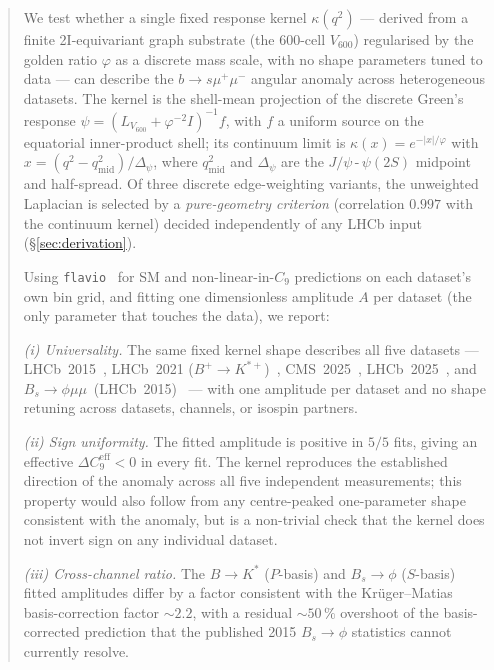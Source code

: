 \documentclass[11pt]{article}
\begin{document}
\begin{abstract}
We test whether a single fixed response kernel $\kappa(q^{2})$ —
derived from a finite 2I-equivariant graph substrate (the 600-cell
$V_{600}$) regularised by the golden ratio $\varphi$ as a discrete
mass scale, with no shape parameters tuned to data — can describe the
$b\to s\mu^{+}\mu^{-}$ angular anomaly across heterogeneous datasets.
The kernel is the shell-mean projection of the discrete Green's
response $\psi = (L_{V_{600}} + \varphi^{-2} I)^{-1} f$, with $f$ a
uniform source on the equatorial inner-product shell; its continuum
limit is $\kappa(x) = e^{-|x|/\varphi}$ with
$x = (q^{2}-q^{2}_{\mathrm{mid}})/\Delta_{\psi}$, where
$q^{2}_{\mathrm{mid}}$ and $\Delta_{\psi}$ are the
$J/\psi$\,-\,$\psi(2S)$ midpoint and half-spread. Of three discrete
edge-weighting variants, the unweighted Laplacian is selected by a
\emph{pure-geometry criterion} (correlation $0.997$ with the continuum
kernel) decided independently of any LHCb input
(\S\ref{sec:derivation}).

Using \texttt{flavio}~\citep{Straub2018Flavio} for SM and
non-linear-in-$C_{9}$ predictions on each dataset's own bin grid, and
fitting one dimensionless amplitude $A$ per dataset (the only
parameter that touches the data), we report:

\noindent\emph{(i) Universality.}
The same fixed kernel shape describes all five datasets —
LHCb~2015~\citep{LHCb2015BKstmumu},
LHCb~2021 ($B^{+}\!\to\!K^{*+}$)~\citep{LHCb2021BKstpmumu},
CMS~2025~\citep{CMS2025BKstmumu},
LHCb~2025~\citep{LHCb2025BKstmumuComp}, and
$B_{s}\!\to\!\phi\mu\mu$~(LHCb~2015)~\citep{LHCb2015Bsphimumu} — with
one amplitude per dataset and no shape retuning across datasets,
channels, or isospin partners.

\noindent\emph{(ii) Sign uniformity.}
The fitted amplitude is positive in $5/5$ fits, giving an effective
$\Delta C_{9}^{\mathrm{eff}}<0$ in every fit. The kernel reproduces
the established direction of the anomaly across all five independent
measurements; this property would also follow from any centre-peaked
one-parameter shape consistent with the anomaly, but is a non-trivial
check that the kernel does not invert sign on any individual dataset.

\noindent\emph{(iii) Cross-channel ratio.}
The $B\to K^{*}$ ($P$-basis) and $B_{s}\!\to\!\phi$ ($S$-basis)
fitted amplitudes differ by a factor consistent with the Krüger--Matias
basis-correction factor $\sim 2.2$, with a residual $\sim 50\,\%$
overshoot of the basis-corrected prediction that the published
2015 $B_{s}\!\to\!\phi$ statistics cannot currently resolve.


\end{abstract}
\end{document}
